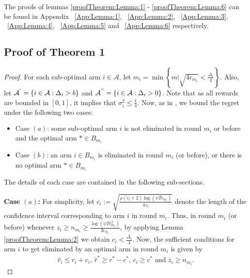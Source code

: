 The proofs of lemmas \ref{proofTheorem:Lemma:1} - \ref{proofTheorem:Lemma:6} can be found in Appendix ~\ref{App:Lemma:1}, ~\ref{App:Lemma:2}, ~\ref{App:Lemma:3}, ~\ref{App:Lemma:4}, ~\ref{App:Lemma:5} and
 ~\ref{App:Lemma:6} respectively.


\subsection*{Proof of Theorem 1}
\label{sec:proofTheorem:Theorem1}
\begin{proof}
For each sub-optimal arm ${i}\in\mathcal{A}$, let $m_{i}=\min{\left\lbrace m|\sqrt{4\epsilon_{m_i}} < \frac{\Delta_{i}}{4}\right\rbrace}$. Also, let $\mathcal{A}^{'}=\lbrace i\in \mathcal{A}: \Delta_{i} > b \rbrace$ and $\mathcal{A}^{''}=\lbrace i\in \mathcal{A}: \Delta_{i} > 0 \rbrace$. Note that as all rewards are bounded in $[0,1]$, it implies that $\sigma_i^2 \leq \frac{1}{4}$. Now, as in \cite{auer2010ucb}, we bound the regret under the following two cases: 
\begin{itemize}
\item {Case $(a)$}: some sub-optimal arm ${i}$ is not eliminated in round $m_{i}$ or before and the optimal arm ${*}\in B_{m_{i}}$
\item {Case $(b)$}: an arm ${i}\in B_{m_i}$ is eliminated in round $m_{i}$ (or before), or there is no optimal arm $*\in B_{m_i}$
\end{itemize} 
The details of each case are contained in the following sub-sections.


\textbf{Case $(a)$:}
For simplicity, let $c_{i} := \sqrt{\frac{\rho (\hat{v}_i + 2) \log (\psi T\epsilon_{m_{i}})}{4 z_{i}}}$ denote the length of the confidence interval corresponding to arm $i$ in round $m_i$. Thus, in round $m_i$ (or before) whenever $z_i \geq n_{m_{i}}\ge\frac{\log{(\psi T\epsilon_{m_{i}}^{2})}}{2\epsilon_{m_{i}}}$, by applying Lemma \ref{proofTheorem:Lemma:2} we obtain $c_{i} < \frac{\Delta_{i}}{4}$.
Now, the sufficient conditions for arm $i$ to get eliminated by an optimal arm in round $m_i$ is given by
	\begin{eqnarray}
	\hat{r}_{i} \leq r_{i} + c_{i} \text{, } \label{eq:armelim-casea}
 	\hat{r}^{*} \geq r^{*} - c^{*} \text{, } c_{i} \geq c^* \text{ and } z_i \geq n_{m_i} .
	\end{eqnarray}


\end{proof}
